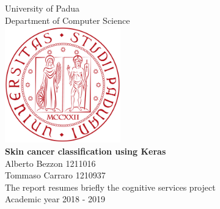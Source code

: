 \documentclass[11pt,oneside]{book}
\begin{document}
	
	
	\frontmatter
	
	\begin{titlepage}
		
		
		
		\begin{center}
			{\LARGE University of Padua}\\[1cm]
			{\Large Department of Computer Science}\\[2cm]
			\includegraphics[width=5cm]{images/logo-unipd.png}\\[2cm]
			\linespread{1.2}\huge {\bfseries Skin cancer classification using Keras}\\[1.5cm]
			\linespread{1}
			{\Large Alberto Bezzon 1211016 \\ Tommaso Carraro 1210937}\\[1cm]
			\large The report resumes briefly the cognitive services project\\[0.5cm] 
			Academic year 2018 - 2019
		\end{center}
		
	\end{titlepage}
	
	
	
	
	
	
\end{document}
